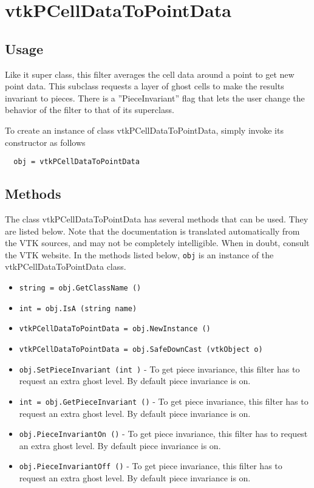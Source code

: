 \section{vtkPCellDataToPointData}

\subsection{Usage}

 Like it super class, this filter averages the cell data around
 a point to get new point data.  This subclass requests a layer of
 ghost cells to make the results invariant to pieces.  There is a 
 ''PieceInvariant'' flag that lets the user change the behavior
 of the filter to that of its superclass.

To create an instance of class vtkPCellDataToPointData, simply
invoke its constructor as follows
\begin{verbatim}
  obj = vtkPCellDataToPointData
\end{verbatim}
\subsection{Methods}

The class vtkPCellDataToPointData has several methods that can be used.
  They are listed below.
Note that the documentation is translated automatically from the VTK sources,
and may not be completely intelligible.  When in doubt, consult the VTK website.
In the methods listed below, \verb|obj| is an instance of the vtkPCellDataToPointData class.
\begin{itemize}
\item  \verb|string = obj.GetClassName ()|

\item  \verb|int = obj.IsA (string name)|

\item  \verb|vtkPCellDataToPointData = obj.NewInstance ()|

\item  \verb|vtkPCellDataToPointData = obj.SafeDownCast (vtkObject o)|

\item  \verb|obj.SetPieceInvariant (int )| -  To get piece invariance, this filter has to request an 
 extra ghost level.  By default piece invariance is on.

\item  \verb|int = obj.GetPieceInvariant ()| -  To get piece invariance, this filter has to request an 
 extra ghost level.  By default piece invariance is on.

\item  \verb|obj.PieceInvariantOn ()| -  To get piece invariance, this filter has to request an 
 extra ghost level.  By default piece invariance is on.

\item  \verb|obj.PieceInvariantOff ()| -  To get piece invariance, this filter has to request an 
 extra ghost level.  By default piece invariance is on.

\end{itemize}
